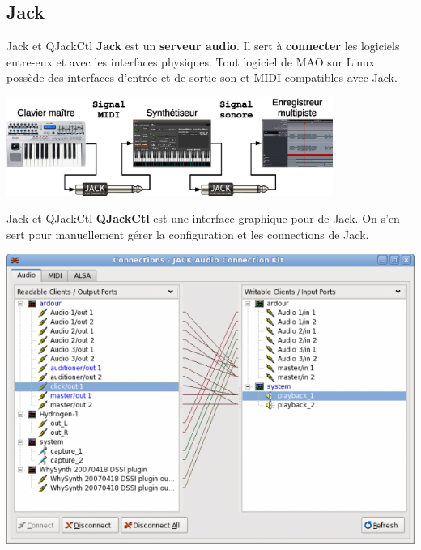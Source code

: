 \documentclass{beamer}
\begin{document}
\subsection{Jack}
\begin{frame}{Jack et QJackCtl}
  \textbf{Jack} est un \textbf{serveur audio}. Il sert à \textbf{connecter} les logiciels entre-eux et avec les interfaces physiques. Tout logiciel de MAO sur Linux possède des interfaces d'entrée et de sortie son et MIDI compatibles avec Jack.
  
  \begin{center}
    \includegraphics[width=0.8\textwidth]{jack_schema.eps}
  \end{center}
\end{frame}

\begin{frame}{Jack et QJackCtl}
  \textbf{QJackCtl} est une interface graphique pour de Jack. On s'en sert pour manuellement gérer la configuration et les connections de Jack.
  
  \begin{center}
    \includegraphics[scale=0.3]{qjackctl_connections.png}
  \end{center}
\end{frame}
\end{document}
